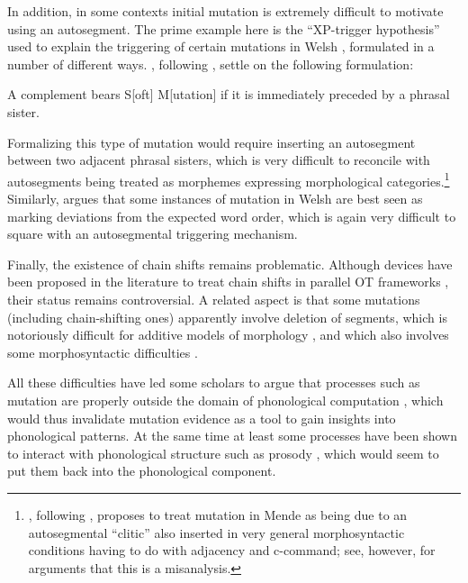 In addition, in some contexts initial mutation is extremely difficult to motivate using an autosegment. The prime example here is the \enquote{XP\hyp trigger hypothesis} used to explain the triggering of certain mutations in Welsh \citep[\egm][]{harlow,xptrig,borsleymut,tallermanforth,syntaxofwelsh}, formulated in a number of different ways. \citet[p.~247]{syntaxofwelsh}, following \citet{borsleymut}, settle on the following formulation:

\begin{displayquote}
  A complement bears S[oft] M[utation] if it is immediately preceded by a phrasal sister.
\end{displayquote}

Formalizing this type of mutation would require inserting an autosegment between two adjacent phrasal sisters, which is very difficult to reconcile with autosegments being treated as morphemes expressing morphological categories.\footnote{\citet{lieberbook}, following \citet{rice-cowper,conteh-cowper-rice}, proposes to treat mutation in Mende as being due to an autosegmental \enquote{clitic} also inserted in very general morphosyntactic conditions having to do with adjacency and c\hyp command; see, however, \citet{vydrine,iosad-toulouse} for arguments that this is a misanalysis.} Similarly, \citet{tallerman} argues that some instances of mutation in Welsh are best seen as marking deviations from the expected word order, which is again very difficult to square with an autosegmental triggering mechanism.

Finally, the existence of chain shifts remains problematic. Although devices have been proposed in the literature to treat chain shifts in parallel OT frameworks \citep{kirchner-lc,wolf2005,wolf-forautosegs}, their status remains controversial. A related aspect is that some mutations (including chain\hyp shifting ones) apparently involve deletion of segments, which is notoriously difficult for additive models of morphology \citep[\cfm][]{bye09:_exten_expon_and_non_concat_morph}, and which also involves some morphosyntactic difficulties \citep{welsharticle}.

All these difficulties have led some scholars to argue that processes such as mutation are properly outside the domain of phonological computation \citep{stewart,green2003,greenbook,bye-allomorphy,leipzig}, which would thus invalidate mutation evidence as a tool to gain insights into phonological patterns. At the same time at least some processes have been shown to interact with phonological structure such as prosody \citep{pyatt}, which would seem to put them back into the phonological component.

